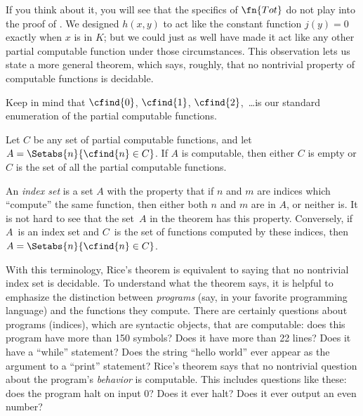 \documentclass[../../../include/open-logic-section]{subfiles}
\begin{document}

If you think about it, you will see that the specifics of $\fn{Tot}$
do not play into the proof of . We designed
$h(x,y)$ to act like the constant function $j(y) = 0$ exactly when $x$
is in $K$; but we could just as well have made it act like any other
partial computable function under those circumstances. This
observation lets us state a more general theorem, which says, roughly,
that no nontrivial property of computable functions is decidable.

Keep in mind that $\cfind{0}$, $\cfind{1}$, $\cfind{2}$,~\dots is our
standard enumeration of the partial computable functions.

\begin{thm}
  Let $C$ be any set of partial computable functions, and let $A =
  \Setabs{n}{\cfind{n} \in C}$. If $A$ is computable, then either $C$
  is empty or $C$ is the set of all the partial computable
  functions.
\end{thm}

An {\em index set} is a set $A$ with the property that if $n$ and $m$
are indices which ``compute'' the same function, then either both $n$
and $m$ are in $A$, or neither is. It is not hard to see that the
set~$A$ in the theorem has this property. Conversely, if $A$~is an
index set and $C$~is the set of functions computed by these indices,
then $A = \Setabs{n}{\cfind{n} \in C}$.

\begin{explain}
With this terminology, Rice's theorem is equivalent to saying that no
nontrivial index set is decidable. To understand what the theorem
says, it is helpful to emphasize the distinction between
\emph{programs} (say, in your favorite programming language) and the
functions they compute. There are certainly questions about programs
(indices), which are syntactic objects, that are computable: does this
program have more than 150 symbols? Does it have more than 22 lines?
Does it have a ``while'' statement? Does the string ``hello world''
ever appear as the argument to a ``print'' statement? Rice's theorem
says that no nontrivial question about the program's \emph{behavior}
is computable. This includes questions like these: does the program
halt on input $0$? Does it ever halt? Does it ever output an even
number?
\end{explain}
\end{document}
